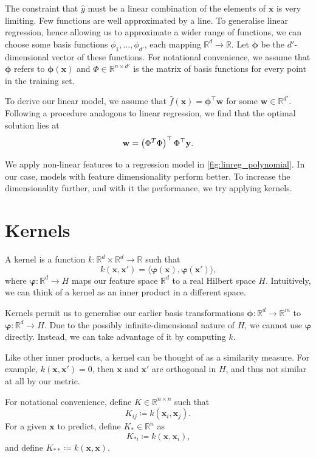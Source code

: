 \documentclass[11pt,twoside,openright]{report}
\newcommand\bphi{\bm{\phi}}
\newcommand\bvarphi{\bm{\varphi}}
\newcommand\bbR{\mathbb{R}}
\newcommand\bw{\mathbf{w}}
\newcommand\bx{\mathbf{x}}
\newcommand\by{\mathbf{y}}
\begin{document}
The constraint that $\hat y$ must be a linear combination of the elements of $\bx$ is very limiting. Few functions are well approximated by a line. To generalise linear regression, hence allowing us to approximate a wider range of functions, we can choose some basis functions $\phi_1, \dots, \phi_{d'}$, each mapping $\bbR^d \to \bbR$. Let $\bphi$ be the $d'$-dimensional vector of these functions. For notational convenience, we assume that $\bphi$ refers to $\bphi(\bx)$ and $\Phi \in \bbR^{n \times d'}$ is the matrix of basis functions for every point in the training set.

To derive our linear model, we assume that $\hat f(\bx) = \bphi^\top \bw$ for some $\bw \in \bbR^{d'}$. Following a procedure analogous to linear regression, we find that the optimal solution lies at \[
  \bw = \left(\Phi^T\Phi\right)^\top \Phi^\top \by \text.
\]

We apply non-linear features to a regression model in \cref{fig:linreg_polynomial}. In our case, models with feature dimensionality perform better. To increase the dimensionality further, and with it the performance, we try applying kernels.

\section{Kernels}

A kernel is a function $k : \bbR^d \times \bbR^d \to \bbR$ such that \[
    k(\bx, \bx') = \langle \bvarphi\left(\bx\right), \bvarphi\left(\bx'\right)\rangle \text{,}
\] where $\bvarphi : \bbR^d \to H$ maps our feature space $\bbR^d$ to a real Hilbert space $H$.\citep{Cheng} Intuitively, we can think of a kernel as an inner product in a different space.

Kernels permit us to generalise our earlier basis transformations $\bphi : \bbR^d \to \bbR^m$ to $\bvarphi : \bbR^d \to H$. Due to the possibly infinite-dimensional nature of $H$, we cannot use $\bvarphi$ directly. Instead, we can take advantage of it by computing $k$.

Like other inner products, a kernel can be thought of as a similarity measure. For example, $k(\bx, \bx') = 0$, then $\bx$ and $\bx'$ are orthogonal in $H$, and thus not similar at all by our metric.

For notational convenience, define $K \in \bbR^{n\times n}$ such that \[
  K_{ij} \coloneqq k(\bx_i, \bx_j) \text{.}
\] For a given $\bx$ to predict, define $K_* \in \bbR^n$ as \[
  K_{*i} \coloneqq k(\bx, \bx_i)\text{,}
\] and define $K_{**} \coloneqq k(\bx, \bx)$.
\end{document}
